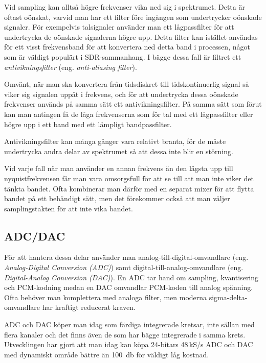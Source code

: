 Vid sampling kan alltså högre frekvenser vika ned sig i spektrumet.
Detta är oftast oönskat, varvid man har ett filter före ingången som
undertrycker oönskade signaler.
För exempelvis talsignaler använder man ett lågpassfilter för att undertrycka de
oönskade signalerna högre upp.
Detta filter kan istället användas för ett visst frekvensband för att
konvertera ned detta band i processen, något som är väldigt populärt i
SDR-sammanhang.
I bägge dessa fall är filtret ett \emph{antivikningsfilter} (eng.
\emph{anti-aliasing filter}).

Omvänt, när man ska konvertera från tidsdiskret till tidskontinuerlig
signal så viker sig signalen uppåt i frekvens, och för att undertrycka dessa
oönskade frekvenser används på samma sätt ett antivikningsfilter.
På samma sätt som förut kan man antingen få de låga frekvenserna som för tal
med ett lågpassfilter eller högre upp i ett band med ett lämpligt
bandpassfilter.

Antivikningsfilter kan många gånger vara relativt branta, för de måste
undertrycka andra delar av spektrumet så att dessa inte blir en störning.

Vid varje fall när man använder en annan frekvens än den lägsta upp till
nyquistfrekvensen får man vara omsorgsfull för att se till att man inte viker
det tänkta bandet.
Ofta kombinerar man därför med en separat mixer för att flytta bandet på ett
behändigt sätt, men det förekommer också att man väljer samplingstakten för att
inte vika bandet.


\subsection{ADC/DAC}
\label{ADC-DAC}

För att hantera dessa delar använder man analog-till-digital-omvandlare
(eng. \emph{Analog-Digital Conversion (ADC)}) samt digital-till-analog-omvandlare 
(eng. \emph{Digital-Analog Conversion (DAC)}).
En ADC tar hand om sampling, kvantisering och PCM-kodning medan en DAC
omvandlar PCM-koden till analog spänning.
Ofta behöver man komplettera med analoga filter, men moderna sigma-delta-omvandlare 
har kraftigt reducerat kraven.

ADC och DAC köper man idag som färdiga integrerade kretsar, inte sällan med
flera kanaler och det finns även de som har bägge integrerade i samma krets.
Utvecklingen har gjort att man idag kan köpa 24-bitars 48\,kS/s ADC och DAC med
dynamiskt område bättre än \qty{100}{\decibel} för väldigt låg kostnad.
